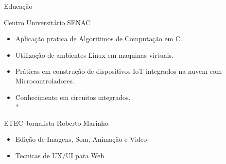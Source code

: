 \documentclass{article}
\newlength{\tabin}
\newlength{\secsep}
\newcommand{\lineunder}{\vspace*{-8pt} \\ \hspace*{-6pt} \hrulefill \\ \vspace*{-15pt}}
\newenvironment{tabbedsection}[1]{
  \begin{list}{}{
      \setlength{\itemsep}{0pt}
      \setlength{\labelsep}{0pt}
      \setlength{\labelwidth}{0pt}
      \setlength{\leftmargin}{\tabin}
      \setlength{\rightmargin}{\tabin}
      \setlength{\listparindent}{0pt}
      \setlength{\parsep}{0pt}
      \setlength{\parskip}{0pt}
      \setlength{\partopsep}{0pt}
      \setlength{\topsep}{#1}
    }
  \item[]
}{\end{list}}
\newenvironment{resume_section}[1]{
  \filbreak
  \vspace{2\secsep}
  \textsc{\large#1}
  \lineunder
  \begin{tabbedsection}{\secsep}
}{\end{tabbedsection}}
\newenvironment{resume_subsection}[2][]{
  \textbf{#2} \hfill {\footnotesize #1} \hspace{2em}
  \begin{tabbedsection}{0.5\secsep}
}{\end{tabbedsection}}
\newenvironment{subitems}{
  \renewcommand{\labelitemi}{-}
  \begin{itemize}
      \setlength{\labelsep}{1em}
}{\end{itemize}}
\begin{document}
\begin{resume_section}{Educação}
  \begin{resume_subsection}{Centro Universitário SENAC}
    \begin{subitems}
      \item Aplicação pratica de Algoritimos de Computação em C.
      \item Utilização de ambientes Linux em maquinas virtuais.
      \item	Práticas em construção de dispositivos IoT integrados na nuvem com Microcontroladores.
      \item Conhecimento em circuitos integrados.
      \\*
    \end{subitems}
  \end{resume_subsection}
  
  \begin{resume_subsection}{ETEC Jornalista Roberto Marinho}
    \begin{subitems}
      \item Edição de Imagens, Som, Animação e Video
      \item Tecnicas de UX/UI para Web
     \end{subitems}
  \end{resume_subsection}
\end{resume_section}
\end{document}
